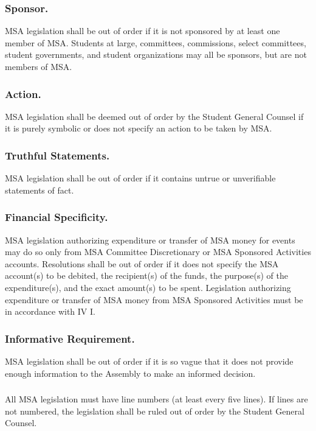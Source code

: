\subsubsection{Sponsor.}  MSA legislation shall be out of order if it is not sponsored by at least one member of MSA.  Students at large, committees, commissions, select committees, student governments, and student organizations may all be sponsors, but are not members of MSA.

\subsubsection{Action.}  MSA legislation shall be deemed out of order by the Student General Counsel if it is purely symbolic or does not specify an action to be taken by MSA.

\subsubsection{Truthful Statements.}  MSA legislation shall be out of order if it contains untrue or unverifiable statements of fact.

\subsubsection{Financial Specificity.}  MSA legislation authorizing expenditure or transfer of MSA money for events may do so only from MSA Committee Discretionary or MSA Sponsored Activities accounts.  Resolutions shall be out of order if it does not specify the MSA account(s) to be debited, the recipient(s) of the funds, the purpose(s) of the expenditure(s), and the exact amount(s) to be spent. Legislation authorizing expenditure or transfer of MSA money from MSA Sponsored Activities must be in accordance with IV I.

\subsubsection{Informative Requirement.}  MSA legislation shall be out of order if it is so vague that it does not provide enough information to the Assembly to make an informed decision.

\subsubsection{}
All MSA legislation must have line numbers (at least every five lines).  If lines are not numbered, the legislation shall be ruled out of order by the Student General Counsel.

